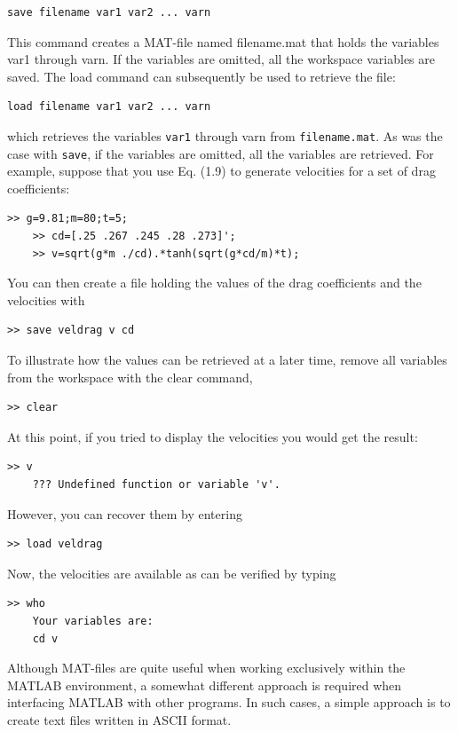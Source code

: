 \documentclass[../main.tex]{subfiles}
\begin{document}
\begin{lstlisting}[frame=none, numbers=none]
    save filename var1 var2 ... varn
\end{lstlisting}
This command creates a MAT-file named filename.mat that holds the variables var1
through varn. If the variables are omitted, all the workspace variables are saved. The load
command can subsequently be used to retrieve the file:


\begin{lstlisting}[frame=none, numbers=none]
    load filename var1 var2 ... varn
\end{lstlisting}
which retrieves the variables \texttt{var1} through varn from \texttt{filename.mat}. As was the case
with \texttt{save}, if the variables are omitted, all the variables are retrieved.
For example, suppose that you use Eq. (1.9) to generate velocities for a set of drag
coefficients:
\begin{lstlisting}[frame=none, numbers=none]
    >> g=9.81;m=80;t=5;
    >> cd=[.25 .267 .245 .28 .273]';
    >> v=sqrt(g*m ./cd).*tanh(sqrt(g*cd/m)*t);
\end{lstlisting}
You can then create a file holding the values of the drag coefficients and the velocities with
\begin{lstlisting}[frame=none, numbers=none]
    >> save veldrag v cd
\end{lstlisting}
To illustrate how the values can be retrieved at a later time, remove all variables from
the workspace with the clear command,
\begin{lstlisting}[frame=none, numbers=none]
    >> clear
\end{lstlisting}
At this point, if you tried to display the velocities you would get the result:
\begin{lstlisting}[frame=none, numbers=none]
    >> v
    ??? Undefined function or variable 'v'.
\end{lstlisting}
However, you can recover them by entering
\begin{lstlisting}[frame=none, numbers=none]
    >> load veldrag
\end{lstlisting}
Now, the velocities are available as can be verified by typing
\begin{lstlisting}[frame=none, numbers=none]
    >> who
    Your variables are:
    cd v
\end{lstlisting}
Although MAT-files are quite useful when working exclusively within the MATLAB
environment, a somewhat different approach is required when interfacing MATLAB with
other programs. In such cases, a simple approach is to create text files written in ASCII
format.
\end{document}
